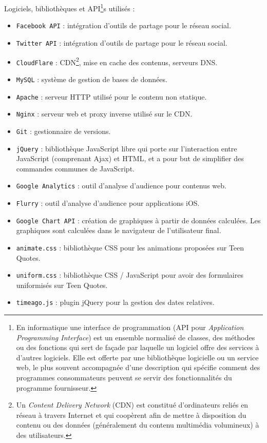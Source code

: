 \documentclass{report}
\begin{document}
	Logiciels, bibliothèques et API\footnote{En informatique une interface de programmation (API pour \textit{Application Programming Interface}) est un ensemble normalisé de classes, des méthodes ou des fonctions qui sert de façade par laquelle un logiciel offre des services à d'autres logiciels. Elle est offerte par une bibliothèque logicielle ou un service web, le plus souvent accompagnée d'une description qui spécifie comment des programmes consommateurs peuvent se servir des fonctionnalités du programme fournisseur.}s utilisés :
	\vspace{10px}
	\begin{itemize}
		\item \texttt{Facebook API} : intégration d'outils de partage pour le réseau social.
		\item \texttt{Twitter API} : intégration d'outils de partage pour le réseau social.
		\item \texttt{CloudFlare} : CDN\footnote{Un \textit{Content Delivery Network} (CDN) est constitué d’ordinateurs reliés en réseau à travers Internet et qui coopèrent afin de mettre à disposition du contenu ou des données (généralement du contenu multimédia volumineux) à des utilisateurs.}, mise en cache des contenus, serveurs DNS.
		\item \texttt{MySQL} : système de gestion de bases de données.
		\item \texttt{Apache} : serveur HTTP utilisé pour le contenu non statique.
		\item \texttt{Nginx} : serveur web et proxy inverse utilisé sur le CDN.
		\item \texttt{Git} : gestionnaire de versions.
		\item \texttt{jQuery} :  bibliothèque JavaScript libre qui porte sur l'interaction entre JavaScript (comprenant Ajax) et HTML, et a pour but de simplifier des commandes communes de JavaScript.
		\item \texttt{Google Analytics} : outil d'analyse d'audience pour contenus web.
		\item \texttt{Flurry} : outil d'analyse d'audience pour applications iOS.
		\item \texttt{Google Chart API} : création de graphiques à partir de données calculées. Les graphiques sont calculées dans le navigateur de l'utilisateur final.
		\item \texttt{animate.css} : bibliothèque CSS pour les animations proposées sur Teen Quotes.
		\item \texttt{uniform.css} : bibliothèque CSS / JavaScript pour avoir des formulaires uniformisés sur Teen Quotes.
		\item \texttt{timeago.js} : plugin jQuery pour la gestion des dates relatives.
	\end{itemize}
	
\end{document}
